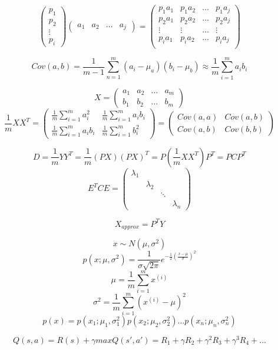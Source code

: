 \documentclass{article}
\begin{document}
\title{}
\author{}
\date{}
\maketitle

$$\begin{pmatrix}
    p_1\\
    p_2\\
    \vdots\\
    p_i
\end{pmatrix}
\begin{pmatrix}
    a_1&a_2&\dots &a_j
\end{pmatrix}=
\begin{pmatrix}
    p_1a_1&p_1a_2&\dots & p_1a_j\\
    p_2a_1&p_2a_2&\dots & p_2a_j\\
    \vdots&\vdots&\dots & \vdots\\
    p_ia_1&p_ia_2&\dots & p_ia_j\\

\end{pmatrix}$$

$$Cov(a,b)=\frac{1}{m-1}\sum_{n=1}^{m}(a_i-\mu_a)(b_i-\mu_b)\approx \frac{1}{m}\sum_{i=1}^{m}a_ib_i$$

$$X=\begin{pmatrix}
    a_1&a_2&\dots &a_m\\
    b_1&b_2&\dots &b_m
\end{pmatrix}$$
$$\frac{1}{m}XX^T=\begin{pmatrix}
    \frac{1}{m}\sum_{i=1}^{m}a_i^2 & \frac{1}{m}\sum_{i=1}^{m}a_ib_i\\
    \frac{1}{m}\sum_{i=1}^{m}a_ib_i & \frac{1}{m}\sum_{i=1}^{m}b_i^2
\end{pmatrix}=\begin{pmatrix}
    Cov(a,a) & Cov(a,b)\\
    Cov(a,b) & Cov(b,b)
\end{pmatrix}$$

$$D=\frac{1}{m}YY^T=\frac{1}{m}(PX)(PX)^T=P(\frac{1}{m}XX^T)P^T=PCP^T$$
$$E^TCE=\begin{pmatrix}
    \lambda_1& & \\
     &\lambda_2&  \\
      & & \ddots & \\
       & & &\lambda_n
\end{pmatrix}$$

$$X_{approx} = P^TY$$

$$x \sim N(\mu, \sigma^2)$$
$$p(x;\mu,\sigma^2)=\frac{1}{\sigma \sqrt{2\pi}} e^{-\frac{1}{2}(\frac{x-\mu}{\sigma})^2}$$
$$\mu=\frac{1}{m}\sum_{i=1}^{m}x^{(i)}$$
$$\sigma^2=\frac{1}{m}\sum_{i=1}^{m}(x^{(i)}-\mu)^2$$
$$p(x)=p(x_1;\mu_1,\sigma^2_1)p(x_2;\mu_2,\sigma^2_2)\dots p(x_n;\mu_n,\sigma^2_n)$$

$$Q(s,a)=R(s)+\gamma maxQ(s',a')=R_1+\gamma R_2+\gamma^2 R_3 + \gamma^3 R_4+ \dots$$
\end{document}

